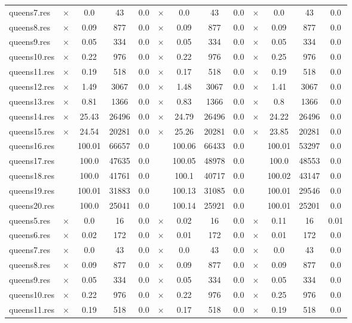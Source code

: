 \documentclass[main.tex]{subfiles}
\begin{document}
\begin{landscape}
\begin{center}
\begin{tabular}{lcccccccccccc}
\\
queens7.res & $\times$ & 0.0 & 43 & 0.0
 & $\times$ & 0.0 & 43 & 0.0
 & $\times$ & 0.0 & 43 & 0.0
\\
queens8.res & $\times$ & 0.09 & 877 & 0.0
 & $\times$ & 0.09 & 877 & 0.0
 & $\times$ & 0.09 & 877 & 0.0
\\
queens9.res & $\times$ & 0.05 & 334 & 0.0
 & $\times$ & 0.05 & 334 & 0.0
 & $\times$ & 0.05 & 334 & 0.0
\\
queens10.res & $\times$ & 0.22 & 976 & 0.0
 & $\times$ & 0.22 & 976 & 0.0
 & $\times$ & 0.25 & 976 & 0.0
\\
queens11.res & $\times$ & 0.19 & 518 & 0.0
 & $\times$ & 0.17 & 518 & 0.0
 & $\times$ & 0.19 & 518 & 0.0
\\
queens12.res & $\times$ & 1.49 & 3067 & 0.0
 & $\times$ & 1.48 & 3067 & 0.0
 & $\times$ & 1.41 & 3067 & 0.0
\\
queens13.res & $\times$ & 0.81 & 1366 & 0.0
 & $\times$ & 0.83 & 1366 & 0.0
 & $\times$ & 0.8 & 1366 & 0.0
\\
queens14.res & $\times$ & 25.43 & 26496 & 0.0
 & $\times$ & 24.79 & 26496 & 0.0
 & $\times$ & 24.22 & 26496 & 0.0
\\
queens15.res & $\times$ & 24.54 & 20281 & 0.0
 & $\times$ & 25.26 & 20281 & 0.0
 & $\times$ & 23.85 & 20281 & 0.0
\\
queens16.res &  & 100.01 & 66657 & 0.0
 &  & 100.06 & 66433 & 0.0
 &  & 100.01 & 53297 & 0.0
\\
queens17.res &  & 100.0 & 47635 & 0.0
 &  & 100.05 & 48978 & 0.0
 &  & 100.0 & 48553 & 0.0
\\
queens18.res &  & 100.0 & 41761 & 0.0
 &  & 100.1 & 40717 & 0.0
 &  & 100.02 & 43147 & 0.0
\\
queens19.res &  & 100.01 & 31883 & 0.0
 &  & 100.13 & 31085 & 0.0
 &  & 100.01 & 29546 & 0.0
\\
queens20.res &  & 100.0 & 25041 & 0.0
 &  & 100.14 & 25921 & 0.0
 &  & 100.01 & 25201 & 0.0
\\
queens5.res & $\times$ & 0.0 & 16 & 0.0
 & $\times$ & 0.02 & 16 & 0.0
 & $\times$ & 0.11 & 16 & 0.01
\\
queens6.res & $\times$ & 0.02 & 172 & 0.0
 & $\times$ & 0.01 & 172 & 0.0
 & $\times$ & 0.01 & 172 & 0.0
\\
queens7.res & $\times$ & 0.0 & 43 & 0.0
 & $\times$ & 0.0 & 43 & 0.0
 & $\times$ & 0.0 & 43 & 0.0
\\
queens8.res & $\times$ & 0.09 & 877 & 0.0
 & $\times$ & 0.09 & 877 & 0.0
 & $\times$ & 0.09 & 877 & 0.0
\\
queens9.res & $\times$ & 0.05 & 334 & 0.0
 & $\times$ & 0.05 & 334 & 0.0
 & $\times$ & 0.05 & 334 & 0.0
\\
queens10.res & $\times$ & 0.22 & 976 & 0.0
 & $\times$ & 0.22 & 976 & 0.0
 & $\times$ & 0.25 & 976 & 0.0
\\
queens11.res & $\times$ & 0.19 & 518 & 0.0
 & $\times$ & 0.17 & 518 & 0.0
 & $\times$ & 0.19 & 518 & 0.0
\\
\hline\end{tabular}
\end{center}
\end{landscape}
\end{document}
